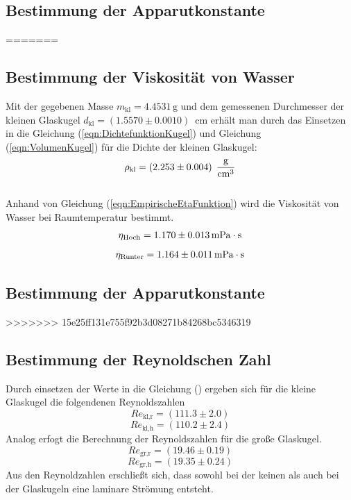 \subsection{Bestimmung der Apparutkonstante}
\label{sec:}

=======

\subsection{Bestimmung der Viskosität von Wasser}
\label{sec:}
Mit der gegebenen Masse $m_{\text{kl}} = 4.4531\,\unit{\gram}$  und dem gemessenen Durchmesser 
der kleinen Glaskugel $d_{\text{kl}}= \left(1.5570 \pm 0.0010\right)\,$ \unit{\centi \meter} erhält man durch
das Einsetzen in die Gleichung (\ref{eqn:DichtefunktionKugel}) und Gleichung (\ref{eqn:VolumenKugel}) für 
die Dichte der kleinen Glaskugel:
$$\rho_{\text{kl}} = \left(2.253 \pm 0.004\right)\;\unit[per-mode=fraction]{\gram\per\cubic\centi\meter}$$\\
Anhand von Gleichung (\ref{eqn:EmpirischeEtaFunktion}) wird die Viskosität von Wasser bei Raumtemperatur bestimmt. 
$$\eta_{\text{Hoch}} = 1.170\pm0.013 \, \unit[inter-unit-product=\cdot]{\milli\pascal\second}$$
$$\eta_{\text{Runter}} = 1.164\pm0.011  \, \unit[inter-unit-product=\cdot]{\milli\pascal\second}$$
\subsection{Bestimmung der Apparutkonstante}
\label{sec:}

>>>>>>> 15e25ff131e755f92b3d08271b84268bc5346319
\subsection{Bestimmung der Reynoldschen Zahl}
Durch einsetzen der Werte in die Gleichung (\label{eqn:Reynoldszahl}) ergeben sich für die 
kleine Glaskugel die folgendenen Reynoldszahlen
$$Re_{\text{kl,r}} = \left(111.3\pm2.0\right)$$
$$Re_{\text{kl,h}} = \left(110.2\pm2.4\right)$$
Analog erfogt die Berechnung der Reynoldszahlen für die große Glaskugel.
$$Re_{\text{gr,r}} = \left(19.46\pm0.19\right)$$
$$Re_{\text{gr,h}} = \left(19.35\pm0.24\right)$$
Aus den Reynoldzahlen erschließt sich, dass sowohl bei der keinen als auch bei der Glaskugeln
eine laminare Strömung entsteht.
